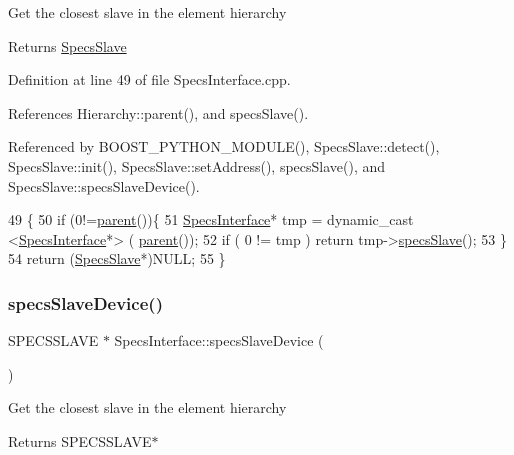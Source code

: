 Get the closest slave in the element hierarchy \begin{DoxyReturn}{Returns}
\hyperlink{classSpecsSlave}{Specs\+Slave} 
\end{DoxyReturn}


Definition at line 49 of file Specs\+Interface.\+cpp.



References Hierarchy\+::parent(), and specs\+Slave().



Referenced by B\+O\+O\+S\+T\+\_\+\+P\+Y\+T\+H\+O\+N\+\_\+\+M\+O\+D\+U\+L\+E(), Specs\+Slave\+::detect(), Specs\+Slave\+::init(), Specs\+Slave\+::set\+Address(), specs\+Slave(), and Specs\+Slave\+::specs\+Slave\+Device().


\begin{DoxyCode}
49                                       \{
50     \textcolor{keywordflow}{if} (0!=\hyperlink{classHierarchy_a1c7bec8257e717f9c1465e06ebf845fc}{parent}())\{
51     \hyperlink{classSpecsInterface}{SpecsInterface}* tmp = dynamic\_cast <\hyperlink{classSpecsInterface}{SpecsInterface}*> (
      \hyperlink{classHierarchy_a1c7bec8257e717f9c1465e06ebf845fc}{parent}());
52     \textcolor{keywordflow}{if} ( 0 != tmp ) \textcolor{keywordflow}{return} tmp->\hyperlink{classSpecsInterface_a13cf39bddfa8ba21d6e6aa78e78f0e4f}{specsSlave}();
53   \}
54   \textcolor{keywordflow}{return} (\hyperlink{classSpecsSlave}{SpecsSlave}*)NULL; 
55 \}
\end{DoxyCode}
\mbox{\label{classSpecsInterface_ac8d4711197f484f055533ec1e5ae01a1}} 
\subsubsection{\texorpdfstring{specs\+Slave\+Device()}{specsSlaveDevice()}}
{\footnotesize\ttfamily S\+P\+E\+C\+S\+S\+L\+A\+VE $\ast$ Specs\+Interface\+::specs\+Slave\+Device (\begin{DoxyParamCaption}{ }\end{DoxyParamCaption})\hspace{0.3cm}{\ttfamily [virtual]}}

Get the closest slave in the element hierarchy \begin{DoxyReturn}{Returns}
S\+P\+E\+C\+S\+S\+L\+A\+V\+E$\ast$ 
\end{DoxyReturn}


